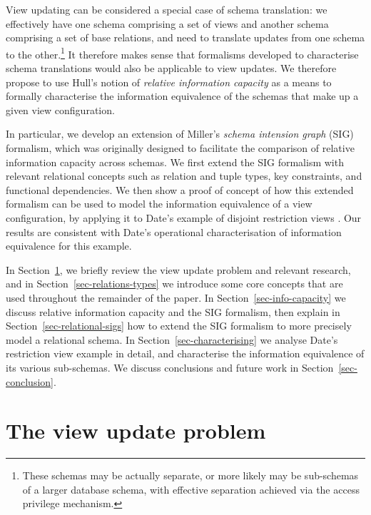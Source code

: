 \documentclass{sig-alternate-05-2015}
\newcounter{constraint}
\begin{document}
View updating can be considered a special case of schema translation: we effectively have one schema comprising a set of views and another schema comprising a set of base relations, and need to translate updates from one schema to the other.\footnote{These schemas may be actually separate, or more likely may be sub-schemas of a larger database schema, with effective separation achieved via the access privilege mechanism.} It therefore makes sense that formalisms developed to characterise schema translations would also be applicable to view updates. We therefore propose to use Hull's notion of \emph{relative information capacity} \cite{Hull.R-1986a-Relative} as a means to formally characterise the information equivalence of the schemas that make up a given view configuration.

In particular, we develop an extension of Miller's \emph{schema intension graph} (SIG) formalism, which was originally designed to facilitate the comparison of relative information capacity across schemas. We first extend the SIG formalism with relevant relational concepts such as relation and tuple types, key constraints, and functional dependencies. We then show a proof of concept of how this extended formalism can be used to model the information equivalence of a view configuration, by applying it to Date's example of disjoint restriction views \cite{Date.C-2013a-View}. Our results are consistent with Date's operational characterisation of information equivalence for this example.

In Section~\ref{sec-view-update-problem}, we briefly review the view update problem and relevant research, and in Section~\ref{sec-relations-types} we introduce some core concepts that are used throughout the remainder of the paper. In Section~\ref{sec-info-capacity} we discuss relative information capacity and the SIG formalism, then explain in Section~\ref{sec-relational-sigs} how to extend the SIG formalism to more precisely model a relational schema. In Section~\ref{sec-characterising} we analyse Date's restriction view example \cite{Date.C-2013a-View} in detail, and characterise the information equivalence of its various sub-schemas. We discuss conclusions and future work in Section~\ref{sec-conclusion}.




\section{The view update problem}
\label{sec-view-update-problem}
\end{document}
